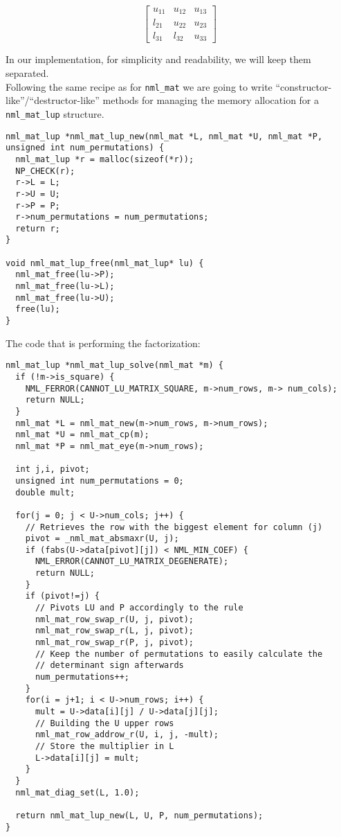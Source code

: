$$
\begin{bmatrix}
u_{11} & u_{12} & u_{13} \\
l_{21} & u_{22} & u_{23} \\
l_{31} & l_{32} & u_{33}
\end{bmatrix}
$$

In our implementation, for simplicity and readability, we will keep them separated.
\\

Following the same recipe as for {\tt nml\_mat} we are going to write ``constructor-like''/``destructor-like'' methods for managing the memory allocation for a {\tt nml\_mat\_lup} structure.

\begin{verbatim}
nml_mat_lup *nml_mat_lup_new(nml_mat *L, nml_mat *U, nml_mat *P, unsigned int num_permutations) {
  nml_mat_lup *r = malloc(sizeof(*r));
  NP_CHECK(r);
  r->L = L;
  r->U = U;
  r->P = P;
  r->num_permutations = num_permutations;
  return r;
}

void nml_mat_lup_free(nml_mat_lup* lu) {
  nml_mat_free(lu->P);
  nml_mat_free(lu->L);
  nml_mat_free(lu->U);
  free(lu);
} 
\end{verbatim}

The code that is performing the factorization:

\begin{verbatim}
nml_mat_lup *nml_mat_lup_solve(nml_mat *m) {
  if (!m->is_square) {
    NML_FERROR(CANNOT_LU_MATRIX_SQUARE, m->num_rows, m-> num_cols);
    return NULL;
  }
  nml_mat *L = nml_mat_new(m->num_rows, m->num_rows);
  nml_mat *U = nml_mat_cp(m);
  nml_mat *P = nml_mat_eye(m->num_rows);

  int j,i, pivot;
  unsigned int num_permutations = 0;
  double mult;

  for(j = 0; j < U->num_cols; j++) {
    // Retrieves the row with the biggest element for column (j)
    pivot = _nml_mat_absmaxr(U, j);
    if (fabs(U->data[pivot][j]) < NML_MIN_COEF) {
      NML_ERROR(CANNOT_LU_MATRIX_DEGENERATE);
      return NULL;
    }
    if (pivot!=j) {
      // Pivots LU and P accordingly to the rule
      nml_mat_row_swap_r(U, j, pivot);
      nml_mat_row_swap_r(L, j, pivot);
      nml_mat_row_swap_r(P, j, pivot);
      // Keep the number of permutations to easily calculate the
      // determinant sign afterwards
      num_permutations++;
    }
    for(i = j+1; i < U->num_rows; i++) {
      mult = U->data[i][j] / U->data[j][j];
      // Building the U upper rows
      nml_mat_row_addrow_r(U, i, j, -mult);
      // Store the multiplier in L
      L->data[i][j] = mult;
    }
  }
  nml_mat_diag_set(L, 1.0);

  return nml_mat_lup_new(L, U, P, num_permutations);
} 
\end{verbatim}

